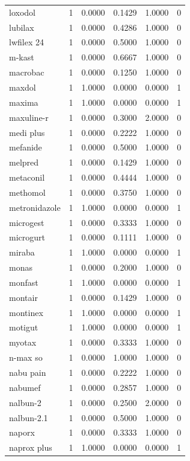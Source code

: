 \begin{longtable}{p{3.0cm}rrrrr}
loxodol & 1 & 0.0000 & 0.1429 & 1.0000 & 0 \\
lubilax & 1 & 0.0000 & 0.4286 & 1.0000 & 0 \\
lwfilex 24 & 1 & 0.0000 & 0.5000 & 1.0000 & 0 \\
m-kast & 1 & 0.0000 & 0.6667 & 1.0000 & 0 \\
macrobac & 1 & 0.0000 & 0.1250 & 1.0000 & 0 \\
maxdol & 1 & 1.0000 & 0.0000 & 0.0000 & 1 \\
maxima & 1 & 1.0000 & 0.0000 & 0.0000 & 1 \\
maxuline-r & 1 & 0.0000 & 0.3000 & 2.0000 & 0 \\
medi plus & 1 & 0.0000 & 0.2222 & 1.0000 & 0 \\
mefanide & 1 & 0.0000 & 0.5000 & 1.0000 & 0 \\
melpred & 1 & 0.0000 & 0.1429 & 1.0000 & 0 \\
metaconil & 1 & 0.0000 & 0.4444 & 1.0000 & 0 \\
methomol & 1 & 0.0000 & 0.3750 & 1.0000 & 0 \\
metronidazole & 1 & 1.0000 & 0.0000 & 0.0000 & 1 \\
microgest & 1 & 0.0000 & 0.3333 & 1.0000 & 0 \\
microgurt & 1 & 0.0000 & 0.1111 & 1.0000 & 0 \\
miraba & 1 & 1.0000 & 0.0000 & 0.0000 & 1 \\
monas & 1 & 0.0000 & 0.2000 & 1.0000 & 0 \\
monfast & 1 & 1.0000 & 0.0000 & 0.0000 & 1 \\
montair & 1 & 0.0000 & 0.1429 & 1.0000 & 0 \\
montinex & 1 & 1.0000 & 0.0000 & 0.0000 & 1 \\
motigut & 1 & 1.0000 & 0.0000 & 0.0000 & 1 \\
myotax & 1 & 0.0000 & 0.3333 & 1.0000 & 0 \\
n-max so & 1 & 0.0000 & 1.0000 & 1.0000 & 0 \\
nabu pain & 1 & 0.0000 & 0.2222 & 1.0000 & 0 \\
nabumef & 1 & 0.0000 & 0.2857 & 1.0000 & 0 \\
nalbun-2 & 1 & 0.0000 & 0.2500 & 2.0000 & 0 \\
nalbun-2.1 & 1 & 0.0000 & 0.5000 & 1.0000 & 0 \\
naporx & 1 & 0.0000 & 0.3333 & 1.0000 & 0 \\
naprox plus & 1 & 1.0000 & 0.0000 & 0.0000 & 1 \\

\end{longtable}
